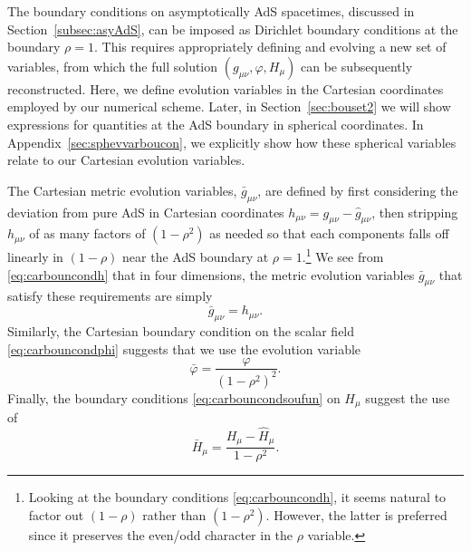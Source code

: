 \documentclass[a4paper,11pt]{article}
\numberwithin{equation}{section}
\begin{document}
The boundary conditions on asymptotically AdS spacetimes, discussed in Section~\ref{subsec:asyAdS}, can be imposed as Dirichlet boundary conditions at the boundary $\rho=1$.
This requires appropriately defining and evolving a new set of variables, from which the full solution $(g_{\mu\nu},\varphi,H_\mu)$ can be subsequently reconstructed. 
Here, we define evolution variables in the Cartesian coordinates employed by our numerical scheme.
Later, in Section~\ref{sec:bouset2} we will show expressions for quantities at the AdS boundary in spherical coordinates.
In Appendix~\ref{sec:sphevvarboucon}, we explicitly show how these spherical variables relate to our Cartesian evolution variables.

The Cartesian metric evolution variables, $\bar{g}_{\mu\nu}$, are defined by first considering the deviation from pure AdS in Cartesian coordinates $h_{\mu\nu}=g_{\mu\nu}-\hat{g}_{\mu\nu}$, then stripping $h_{\mu\nu}$ of as many factors of $(1-\rho^2)$ as needed so that each components falls off linearly in $(1-\rho)$ near the AdS boundary at $\rho=1$.\footnote{Looking at the boundary conditions \eqref{eq:carbouncondh}, it seems natural to factor out $(1-\rho)$ rather than $(1-\rho^2)$. However, the latter is preferred since it preserves the even/odd character in the $\rho$ variable.}
We see from \eqref{eq:carbouncondh} that in four dimensions, the metric evolution variables $\bar{g}_{\mu\nu}$ that satisfy these requirements are simply 
\begin{equation}\label{eq:gbarcart}
\bar{g}_{\mu\nu}=h_{\mu\nu}.
\end{equation}
Similarly, the Cartesian boundary condition on the scalar field \eqref{eq:carbouncondphi} suggests that we use the evolution variable
\begin{equation}
\label{eq:phibarcart}
\bar{\varphi}=\frac{\varphi }{(1-\rho^2)^2}.
\end{equation}
Finally, the boundary conditions \eqref{eq:carbouncondsoufun} on $H_\mu$ suggest the use of
\begin{equation}\label{eq:soufunb}
\bar{H}_\mu=\frac{H_\mu-\hat{H}_\mu}{1-\rho^2 }.
\end{equation}
\end{document}
